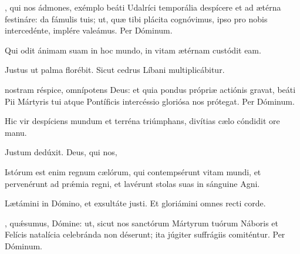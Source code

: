 \documentclass[fontsize=9pt,paper=A6,twoside,BCOR=1mm,DIV=22,headinclude]{scrarticle}
\renewcommand\A{\Ant}
\begin{document}
\begin{multicols}{2}
{
, qui nos ádmones, exémplo beáti Udalríci temporália despícere et ad ætérna festináre: da fámulis tuis; ut, quæ tibi plácita cognóvimus, ipso pro nobis intercedénte, implére valeámus. Per Dóminum.

}

{

\A Qui odit ánimam suam in hoc mundo, in vitam ætérnam custódit eam.

\V Justus ut palma florébit.
\R Sicut cedrus Líbani multiplicábitur.

 nostram réspice, omnípotens Deus: et quia pondus própriæ actiónis gravat, beáti Pii Mártyris tui atque Pontíficis intercéssio gloriósa nos prótegat. Per Dóminum.


\A Hic vir despíciens mundum et terréna triúmphans, divítias cælo cóndidit ore manu.

\V Justum dedúxit.  Deus, qui nos, 


\A Istórum est enim regnum cælórum, qui contempsérunt vitam mundi, et pervenérunt ad pr\'æmia regni, et lavérunt stolas suas in sánguine Agni.

\V Lætámini in Dómino, et exsultáte justi.
\R Et gloriámini omnes recti corde.

}

, quǽsumus, Dómine: ut, sicut nos sanctórum Mártyrum tuórum Náboris et Felícis natalícia celebránda non déserunt; ita júgiter suffrágiis comiténtur. Per Dóminum.












\end{multicols}
\end{document}
